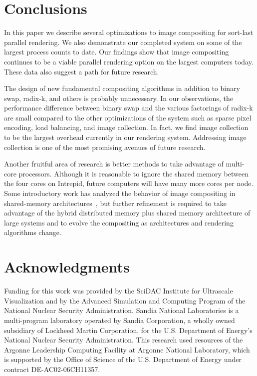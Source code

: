 \documentclass{sig-alternate}
\newcommand*{\lcite}[1]{~\cite{#1}}
\begin{document}
\section{Conclusions}
\label{sec:Conclusions}

In this paper we describe several optimizations to image compositing for
sort-last parallel rendering.  We also demonstrate our completed system on
some of the largest process counts to date.  Our findings show that image
compositing continues to be a viable parallel rendering option on the
largest computers today.  These data also suggest a path for future
research.

The design of new fundamental compositing algorithms in addition to binary
swap, radix-k, and others is probably unnecessary.  In our observations,
the performance difference between binary swap and the various factorings
of radix-k are small compared to the other optimizations of the system such
as sparse pixel encoding, load balancing, and image collection.  In fact,
we find image collection to be the largest overhead currently in our
rendering system.  Addressing image collection is one of the most promising
avenues of future research.

Another fruitful area of research is better methods to take advantage of
multi-core processors.  Although it is reasonable to ignore the shared
memory between the four cores on Intrepid, future computers will have many
more cores per node.  Some introductory work has analyzed the behavior of
image compositing in shared-memory
architectures\lcite{Howison2010,Nouanesengsy2011,Reinhard2000,Peterka2008},
but further refinement is required to take advantage of the hybrid
distributed memory plus shared memory architecture of large systems and to
evolve the compositing as architectures and rendering algorithms change.

\section{Acknowledgments}

Funding for this work was provided by the SciDAC Institute for Ultrascale
Visualization and by the Advanced Simulation and Computing Program of
the National Nuclear Security Administration.
%
Sandia National Laboratories is a multi-program laboratory operated by
Sandia Corporation, a wholly owned subsidiary of Lockheed Martin
Corporation, for the U.S. Department of Energy's National Nuclear Security
Administration.
%
This research used resources of the Argonne Leadership Computing Facility
at Argonne National Laboratory, which is supported by the Office of Science
of the U.S. Department of Energy under contract DE-AC02-06CH11357.


%

\end{document}
